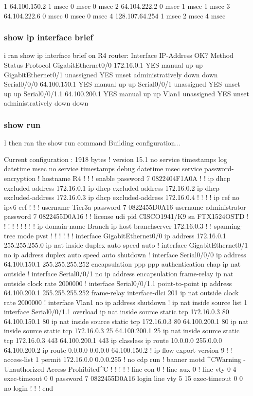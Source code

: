   1   64.100.150.2    1 msec    0 msec    0 msec    
  2   64.104.222.2    0 msec    1 msec    1 msec    
  3   64.104.222.6    0 msec    0 msec    0 msec    
  4   128.107.64.254  1 msec    2 msec    4 msec    

\subsubsection{show ip interface brief}
i ran show ip interface brief on R4 router:
Interface              IP-Address      OK? Method Status                Protocol 
GigabitEthernet0/0     172.16.0.1      YES manual up                    up 
GigabitEthernet0/1     unassigned      YES unset  administratively down down 
Serial0/0/0            64.100.150.1    YES manual up                    up 
Serial0/0/1            unassigned      YES unset  up                    up 
Serial0/0/1.1          64.100.200.1    YES manual up                    up 
Vlan1                  unassigned      YES unset  administratively down down

\subsubsection{show run}

I then ran the show run command
Building configuration...

Current configuration : 1918 bytes
!
version 15.1
no service timestamps log datetime msec
no service timestamps debug datetime msec
service password-encryption
!
hostname R4
!
!
!
enable password 7 0822404F1A0A
!
!
ip dhcp excluded-address 172.16.0.1
ip dhcp excluded-address 172.16.0.2
ip dhcp excluded-address 172.16.0.3
ip dhcp excluded-address 172.16.0.4
!
!
!
!
ip cef
no ipv6 cef
!
!
!
username Tier3a password 7 0822455D0A16
username administrator password 7 0822455D0A16
!
!
license udi pid CISCO1941/K9 sn FTX1524OSTD
!
!
!
!
!
!
!
!
!
ip domain-name Branch
ip host branchserver 172.16.0.3 
!
!
spanning-tree mode pvst
!
!
!
!
!
!
interface GigabitEthernet0/0
 ip address 172.16.0.1 255.255.255.0
 ip nat inside
 duplex auto
 speed auto
!
interface GigabitEthernet0/1
 no ip address
 duplex auto
 speed auto
 shutdown
!
interface Serial0/0/0
 ip address 64.100.150.1 255.255.255.252
 encapsulation ppp
 ppp authentication chap
 ip nat outside
!
interface Serial0/0/1
 no ip address
 encapsulation frame-relay
 ip nat outside
 clock rate 2000000
!
interface Serial0/0/1.1 point-to-point
 ip address 64.100.200.1 255.255.255.252
 frame-relay interface-dlci 201
 ip nat outside
 clock rate 2000000
!
interface Vlan1
 no ip address
 shutdown
!
ip nat inside source list 1 interface Serial0/0/1.1 overload
ip nat inside source static tcp 172.16.0.3 80 64.100.150.1 80 
ip nat inside source static tcp 172.16.0.3 80 64.100.200.1 80 
ip nat inside source static tcp 172.16.0.3 25 64.100.200.1 25 
ip nat inside source static tcp 172.16.0.3 443 64.100.200.1 443 
ip classless
ip route 10.0.0.0 255.0.0.0 64.100.200.2 
ip route 0.0.0.0 0.0.0.0 64.100.150.2 
!
ip flow-export version 9
!
!
access-list 1 permit 172.16.0.0 0.0.0.255
!
no cdp run
!
banner motd ^CWarning - Unauthorized Access Prohibited^C
!
!
!
!
!
line con 0
!
line aux 0
!
line vty 0 4
 exec-timeout 0 0
 password 7 0822455D0A16
 login
line vty 5 15
 exec-timeout 0 0
 no login
!
!
!
end


